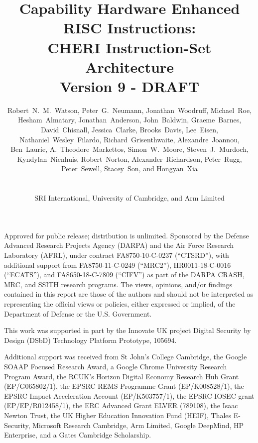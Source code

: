 \documentclass[12pt,twoside,openright,a4paper]{report}
\begin{document}
\title{Capability Hardware Enhanced RISC Instructions: \\
  \smallskip CHERI Instruction-Set Architecture \\
  {\large Version 9 - DRAFT}}
\author{
  \parbox{\linewidth}{\centering%
    Robert~N.~M.~Watson,
    Peter~G.~Neumann,
    Jonathan~Woodruff,
    Michael~Roe,
    Hesham~Almatary,
    Jonathan~Anderson,
    John~Baldwin,
    Graeme~Barnes,
    David~Chisnall,
    Jessica~Clarke,
    Brooks~Davis,
    Lee~Eisen,
    Nathaniel~Wesley~Filardo,
    Richard~Grisenthwaite,
    Alexandre~Joannou,
    Ben~Laurie,
    A.~Theodore~Markettos,
    Simon~W.~Moore,
    Steven~J.~Murdoch,
    Kyndylan~Nienhuis,
    Robert~Norton,
    Alexander~Richardson,
    Peter~Rugg,
    Peter~Sewell,
    Stacey~Son, and
    Hongyan~Xia
  }%
  \\
  \\
  SRI International, University of Cambridge, and Arm Limited
}

\ifdefined\trformat
\else
\begin{minipage}[h]{\textwidth}
  \maketitle

  {\footnotesize
    Approved for public release; distribution is unlimited.
    Sponsored by the Defense Advanced Research Projects Agency (DARPA) and the
    Air Force Research Laboratory (AFRL), under contract FA8750-10-C-0237
    (``CTSRD''), with additional support from FA8750-11-C-0249 (``MRC2''),
    HR0011-18-C-0016 (``ECATS''), and FA8650-18-C-7809 (``CIFV'') as part of
    the DARPA CRASH, MRC, and SSITH research programs.
    The views, opinions, and/or findings contained in this report are those of
    the authors and should not be interpreted as representing the official
    views or policies, either expressed or implied, of the Department of
    Defense or the U.S. Government.

    \smallskip
    This work was supported in part by the Innovate UK project Digital
    Security by Design (DSbD) Technology Platform Prototype, 105694.

    \smallskip
    Additional support was received from St John's College Cambridge,
    the Google SOAAP Focused Research Award, a Google Chrome University
    Research Program Award, the RCUK's Horizon Digital Economy Research Hub
    Grant (EP/G065802/1), the EPSRC REMS Programme Grant (EP/K008528/1), the
    EPSRC Impact Acceleration Account (EP/K503757/1), the EPSRC IOSEC grant
    (EP/EP/R012458/1), the ERC Advanced Grant ELVER (789108), the Isaac Newton
    Trust, the UK Higher Education Innovation Fund (HEIF), Thales E-Security,
    Microsoft Research Cambridge, Arm Limited, Google DeepMind, HP Enterprise,
    and a Gates Cambridge Scholarship.

}
\end{minipage}
\fi
\end{document}
